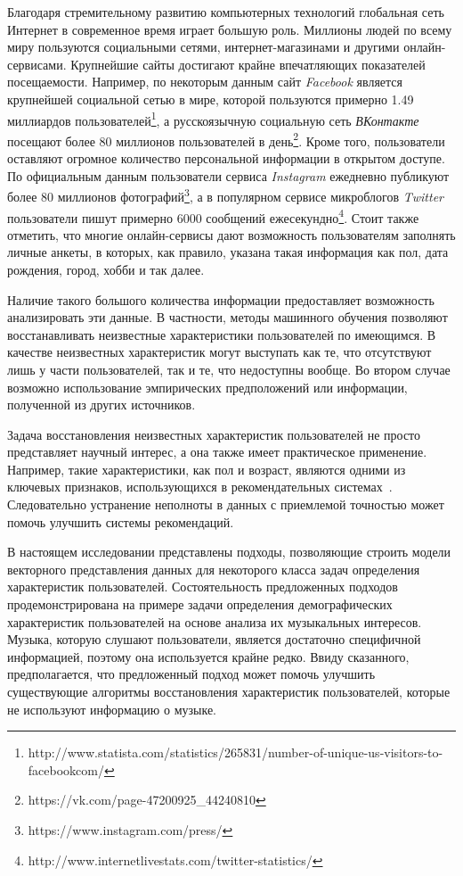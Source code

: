 \startprefacepage

Благодаря стремительному развитию компьютерных технологий глобальная
сеть Интернет в современное время играет большую роль. Миллионы
людей по всему миру пользуются социальными сетями, интернет-магазинами
и другими онлайн-сервисами. Крупнейшие сайты достигают крайне
впечатляющих показателей посещаемости. Например, по некоторым данным 
сайт \textit{Facebook} является крупнейшей социальной сетью в мире,
которой пользуются примерно 1.49 миллиардов 
пользователей\footnote{http://www.statista.com/statistics/265831/number-of-unique-us-visitors-to-facebookcom/},
а русскоязычную социальную сеть \textit{ВКонтакте}
посещают более 80 миллионов пользователей в 
день\footnote{https://vk.com/page-47200925\_44240810}.
Кроме того, пользователи оставляют огромное количество
персональной информации в открытом доступе. По
официальным данным пользователи сервиса \textit{Instagram}
ежедневно публикуют более 80 миллионов
фотографий\footnote{https://www.instagram.com/press/}, а
в популярном сервисе микроблогов \textit{Twitter} 
пользователи пишут примерно 6000 сообщений
ежесекундно\footnote{http://www.internetlivestats.com/twitter-statistics/}.
Стоит также отметить, что многие онлайн-сервисы дают
возможность пользователям заполнять личные анкеты,
в которых, как правило, указана такая информация как
пол, дата рождения, город, хобби и так далее.

Наличие такого большого количества информации предоставляет возможность
анализировать эти данные. В частности, методы машинного обучения 
позволяют восстанавливать неизвестные характеристики пользователей по имеющимся.
В качестве неизвестных характеристик могут выступать как те,
что отсутствуют лишь у части пользователей, так и те, что недоступны
вообще. Во втором случае возможно использование эмпирических
предположений или информации, полученной из других источников.

Задача восстановления неизвестных характеристик пользователей 
не просто представляет научный интерес, а она также имеет практическое
применение. Например, такие характеристики, как пол и возраст, являются
одними из ключевых признаков, использующихся в рекомендательных
системах~\cite{swearingen2001beyond,adomavicius2005toward}.
Следовательно устранение неполноты в данных с приемлемой точностью
может помочь улучшить системы рекомендаций.

В настоящем исследовании представлены подходы, позволяющие
строить модели векторного представления данных для некоторого класса
задач определения характеристик пользователей. Состоятельность
предложенных подходов продемонстрирована на примере задачи определения
демографических характеристик пользователей на основе анализа их
музыкальных интересов. Музыка, которую слушают пользователи, является
достаточно специфичной информацией, поэтому она используется крайне редко.
Ввиду сказанного, предполагается, что предложенный подход может помочь
улучшить существующие алгоритмы восстановления характеристик пользователей,
которые не используют информацию о музыке.
